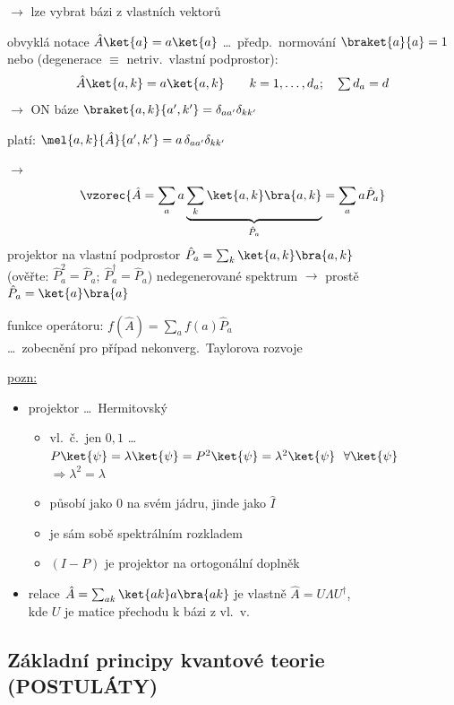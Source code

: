 \documentclass[11pt,a4paper]{article}
\begin{document}
$\to$ lze vybrat bázi z vlastních vektorů

obvyklá notace \quad $\hat A\ket{a} = a\ket{a}$ \quad \dots\ předp.\ normování $\braket{a}{a} = 1$ \\
nebo (degenerace $\equiv$ netriv.\ vlastní podprostor):
\[
  \hat A\ket{a,k} = a\ket{a,k} \qquad k = 1,\dots,d_a;\quad \textstyle\sum d_a = d
\]
\quad $\to$ ON báze \quad $\braket{a,k}{a',k'} = \delta_{aa'}\delta_{kk'}$

platí: \quad $\mel{a,k}{\hat A}{a',k'} = a\,\delta_{aa'}\delta_{kk'}$

$\to$ 
\[
  \vzorec{\hat A = \sum_a a\underbrace{\sum_k \ket{a,k}\bra{a,k}}_{\hat P_a} = \sum_a a\hat P_a}
\]
\quad projektor na vlastní podprostor \quad $\hat P_a = \sum_k\ket{a,k}\bra{a,k}$ \\
\quad (ověřte: $\hat P_a^2 = \hat P_a$; $\hat P_a^\dagger = \hat P_a$) \quad nedegenerované spektrum $\to$ prostě $\hat P_a = \ket{a}\bra{a}$

funkce operátoru: \quad $f(\hat A) = \sum_a f(a)\hat P_a$ \\
\quad \dots\ zobecnění pro případ nekonverg.\ Taylorova rozvoje

\underline{pozn:}
\begin{itemize}[nosep]
  \item projektor \dots\ Hermitovský
  \begin{itemize}[nosep]
    \item[--] vl.\ č.\ jen $0, 1$ \quad \dots\ $P\ket{\psi} = \lambda\ket{\psi} = P^2\ket{\psi} = \lambda^2\ket{\psi}\ \ \forall\ket{\psi}$ \quad $\Rightarrow \lambda^2 = \lambda$
    \item[--] působí jako $0$ na svém jádru, jinde jako $\hat I$
    \item[--] je sám sobě spektrálním rozkladem
    \item[--] $(I - P)$ je projektor na ortogonální doplněk
  \end{itemize}
  \item relace $\hat A = \sum_{ak}\ket{ak}a\bra{ak}$ je vlastně $\hat A = U\Lambda U^\dagger$, \\
        kde $U$ je matice přechodu k bázi z vl.\ v.
\end{itemize}

\subsection{Základní principy kvantové teorie (POSTULÁTY)}
\end{document}
